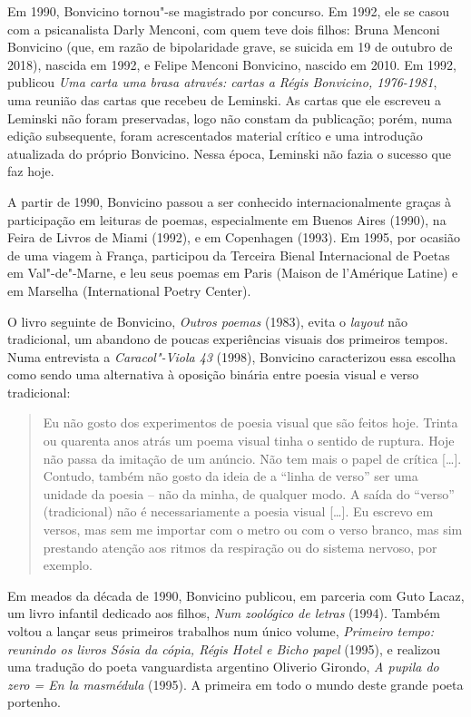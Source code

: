 Em 1990, Bonvicino tornou"-se magistrado por concurso. Em 1992, ele se
casou com a psicanalista Darly Menconi, com quem teve dois filhos: Bruna
Menconi Bonvicino (que, em razão de bipolaridade grave, se suicida em 19
de outubro de 2018), nascida em 1992, e Felipe Menconi Bonvicino,
nascido em 2010. Em 1992, publicou \emph{Uma carta uma brasa através:
cartas a Régis Bonvicino, 1976-1981}, uma reunião das cartas que recebeu
de Leminski. As cartas que ele escreveu a Leminski não foram
preservadas, logo não constam da publicação; porém, numa edição
subsequente, foram acrescentados material crítico e uma introdução
atualizada do próprio Bonvicino. Nessa época, Leminski não fazia o
sucesso que faz hoje.

A partir de 1990, Bonvicino passou a ser conhecido internacionalmente
graças à participação em leituras de poemas, especialmente em Buenos
Aires (1990), na Feira de Livros de Miami (1992), e em Copenhagen
(1993). Em 1995, por ocasião de uma viagem à França, participou da
Terceira Bienal Internacional de Poetas em Val"-de"-Marne, e leu seus
poemas em Paris (Maison de l'Amérique Latine) e em Marselha
(International Poetry Center).

O livro seguinte de Bonvicino, \emph{Outros poemas} (1983), evita o
\emph{layout} não tradicional, um abandono de poucas experiências
visuais dos primeiros tempos. Numa entrevista a \emph{Caracol"-Viola 43}
(1998), Bonvicino caracterizou essa escolha como sendo uma alternativa à
oposição binária entre poesia visual e verso tradicional:

\begin{quote}
Eu não gosto dos experimentos de poesia visual que são feitos hoje.
Trinta ou quarenta anos atrás um poema visual tinha o sentido de
ruptura. Hoje não passa da imitação de um anúncio. Não tem mais o papel
de crítica {[}\ldots{}{]}. Contudo, também não gosto da ideia de a
``linha de verso'' ser uma unidade da poesia -- não da minha, de
qualquer modo. A saída do ``verso'' (tradicional) não é necessariamente
a poesia visual {[}\ldots{}{]}. Eu escrevo em versos, mas sem me
importar com o metro ou com o verso branco, mas sim prestando atenção
aos ritmos da respiração ou do sistema nervoso, por exemplo.
\end{quote}

Em meados da década de 1990, Bonvicino publicou, em parceria com Guto
Lacaz, um livro infantil dedicado aos filhos, \emph{Num zoológico de
letras} (1994). Também voltou a lançar seus primeiros trabalhos num
único volume, \emph{Primeiro tempo: reunindo os livros Sósia da cópia,
Régis Hotel e Bicho papel} (1995), e realizou uma tradução do poeta
vanguardista argentino Oliverio Girondo, \emph{A pupila do zero = En la
masmédula} (1995). A primeira em todo o mundo deste grande poeta
portenho.

